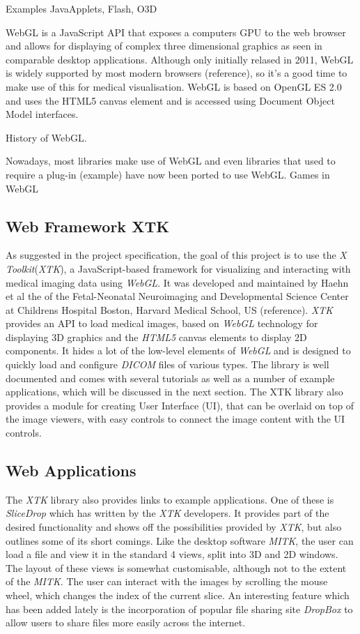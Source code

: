 \documentclass[a4paper,11pt,titlepage]{article}
\begin{document}
Examples JavaApplets, Flash, O3D

WebGL is a JavaScript API that exposes a computers GPU to the web browser and allows for displaying of complex three dimensional graphics as seen in comparable desktop applications. Although only initially relased in 2011, WebGL is widely supported by most modern browsers (reference), so it's a good time to make use of this for medical visualisation. WebGL is based on OpenGL ES 2.0 and uses the HTML5 canvas element and is accessed using Document Object Model interfaces.

History of WebGL. 

Nowadays, most libraries make use of WebGL and even libraries that used to require a plug-in (example) have now been ported to use WebGL. 
Games in WebGL


\subsection{Web Framework XTK}

As suggested in the project specification, the goal of this project is to use the \textit{X Toolkit}(\textit{XTK}), a JavaScript-based framework for visualizing and interacting with medical imaging data using \textit{WebGL}. It was developed and maintained by Haehn et al the of the Fetal-Neonatal Neuroimaging and Developmental Science Center at Childrens Hospital Boston, Harvard Medical School, US (reference). \textit{XTK} provides an API to load medical images, based on \textit{WebGL} technology for displaying 3D graphics and the \textit{HTML5} canvas elements to display 2D components. It hides a lot of the low-level elements of \textit{WebGL} and is designed to quickly load and configure \textit{DICOM} files of various types. The library is well documented and comes with several tutorials as well as a number of example applications, which will be discussed in the next section.
The XTK library also provides a module for creating User Interface (UI), that can be overlaid on top of the image viewers, with easy controls to connect the image content with the UI controls.


\subsection{Web Applications}
The \textit{XTK} library also provides links to example applications. One of these is \textit{SliceDrop} which has written by the \textit{XTK} developers. It provides part of the desired functionality and shows off the possibilities provided by \textit{XTK}, but also outlines some of its short comings. Like the desktop software \textit{MITK}, the user can load a file and view it in the standard 4 views, split into 3D and 2D windows. The layout of these views is somewhat customisable, although not to the extent of the \textit{MITK}. The user can interact with the images by scrolling the mouse wheel, which changes the index of the current slice. An interesting feature which has been added lately is the incorporation of popular file sharing site \textit{DropBox} to allow users to share files more easily across the internet.
\end{document}
